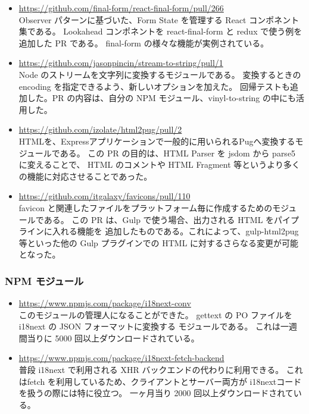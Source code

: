 \documentclass{res}
\begin{document}
\begin{resume}
\begin{itemize}
  \item \url{https://github.com/final-form/react-final-form/pull/266} \\
  Observer パターンに基づいた、Form State を管理する React コンポネント集である。
  Lookahead コンポネントを react-final-form と redux で使う例を追加した PR である。
  final-form の様々な機能が実例されている。

  \item \url{https://github.com/jasonpincin/stream-to-string/pull/1} \\
  Node のストリームを文字列に変換するモジュールである。
  変換するときの encoding を指定できるよう、新しいオプションを加えた。
  回帰テストも追加した。PR の内容は、自分の NPM モジュール、vinyl-to-string
  の中にも活用した。

  \item \url{https://github.com/izolate/html2pug/pull/2} \\
  HTMLを、Expressアプリケーションで一般的に用いられるPugへ変換するモジュールである。
  この PR の目的は、HTML Parser を jsdom から parse5 に変えることで、
  HTML のコメントや HTML Fragment 等というより多くの機能に対応させることであった。

  \item \url{https://github.com/itgalaxy/favicons/pull/110} \\
  favicon と関連したファイルをプラットフォーム毎に作成するためのモジュールである。
  この PR は、Gulp で使う場合、出力される HTML をパイプラインに入れる機能を
  追加したものである。これによって、gulp-html2pug等といった他の
  Gulp プラグインでの HTML に対するさらなる変更が可能となった。

\end{itemize}

\subsubsection{NPM モジュール}

\begin{itemize}
  \item \url{https://www.npmjs.com/package/i18next-conv} \\
  このモジュールの管理人になることができた。
  gettext の PO ファイルを i18next の JSON フォーマットに変換する
  モジュールである。
  これは一週間当りに 5000 回以上ダウンロードされている。

  \item \url{https://www.npmjs.com/package/i18next-fetch-backend} \\
  普段 i18next で利用される XHR バックエンドの代わりに利用できる。
  これはfetch を利用しているため、クライアントとサーバー両方が
  i18nextコードを扱うの際には特に役立つ。
  一ヶ月当り 2000 回以上ダウンロードされている。


\end{itemize}
\end{resume}
\end{document}
